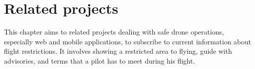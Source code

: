 \chapter{Related projects}\label{ch:related-projects}
This chapter aims to related projects dealing with safe drone operations, especially web and mobile applications, to subscribe to current information about flight restrictions.
It involves showing a restricted area to flying, guide with advisories, and terms that a pilot has to meet during his flight.














